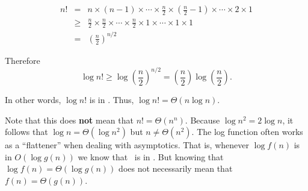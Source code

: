 \begin{example}
{\small
\begin{eqnarray*}
n! &=& n \times (n - 1) \times \cdots \times \frac{n}{2} \times
(\frac{n}{2} - 1) \times \cdots \times 2 \times 1\\
&\geq& \frac{n}{2} \times \frac{n}{2} \times \cdots \times \frac{n}{2}
\times 1 \times \cdots \times 1 \times 1\\
&=& (\frac{n}{2})^{n/2}
\end{eqnarray*}
}

Therefore
\[\log n! \geq \log(\frac{n}{2})^{n/2} =
(\frac{n}{2})\log(\frac{n}{2}).\]

In other words, \(\log n!\) is in \Omeganlogn.
Thus, \(\log n! = \Theta(n \log n)\).

Note that this does \textbf{not} mean that \(n! = \Theta(n^n)\).
Because \(\log n^2 = 2 \log n\), it follows that
\(\log n = \Theta(\log n^2)\) but \(n \neq \Theta(n^2)\).
The log function often works as a ``flattener'' when dealing with
asymptotics.
That is, whenever \(\log f(n)\) is in \(O(\log g(n))\) we know that
\fn\ is in \Ogn.
But knowing that \(\log f(n) = \Theta(\log g(n))\) does not
necessarily mean that \(f(n) = \Theta(g(n))\).
\end{example}

